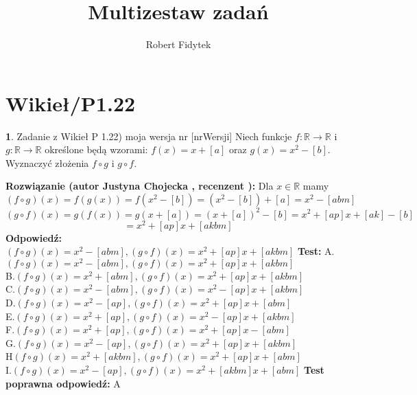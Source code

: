 \documentclass[12pt, a4paper]{article}
\title{Multizestaw zadań}
\author{Robert Fidytek}
\date{}
\theoremstyle{definition} %
\newtheorem{zad}{}
\newcommand{\kategoria}[1]{\section{#1}} %
\newcommand{\zadStart}[1]{\begin{zad}#1\newline} %
\newcommand{\zadStop}{\end{zad}}   %
\newcommand{\rozwStart}[2]{\noindent \textbf{Rozwiązanie (autor #1 , recenzent #2): }\newline} %
\newcommand{\rozwStop}{\newline}                                            %
\newcommand{\odpStart}{\noindent \textbf{Odpowiedź:}\newline}    %
\newcommand{\odpStop}{\newline}                                             %
\newcommand{\testStart}{\noindent \textbf{Test:}\newline} %
\newcommand{\testStop}{\newline} %
\newcommand{\kluczStart}{\noindent \textbf{Test poprawna odpowiedź:}\newline} %
\newcommand{\kluczStop}{\newline} %
\begin{document}
\maketitle


\kategoria{Wikieł/P1.22}
\zadStart{Zadanie z Wikieł P 1.22) moja wersja nr [nrWersji]}
Niech funkcje $f:\mathbb{R}\rightarrow\mathbb{R}$ i $g:\mathbb{R}\rightarrow\mathbb{R}$ określone będą wzorami: $f(x)=x+[a]$ oraz $g(x)=x^{2}-[b]$. Wyznaczyć złożenia $f\circ g$ i $g\circ f$.
\zadStop
\rozwStart{Justyna Chojecka}{}
Dla $x\in \mathbb{R}$ mamy
$$(f\circ g)(x)=f(g(x))=f(x^{2}-[b])=(x^{2}-[b])+[a]=x^2-[abm]$$
$$(g\circ f)(x)=g(f(x))=g(x+[a])=(x+[a])^{2}-[b]=x^{2}+[ap]x+[ak]-[b]$$$$=x^{2}+[ap]x+[akbm]$$
\rozwStop
\odpStart
$(f\circ g)(x)=x^2-[abm], (g\circ f)(x)=x^{2}+[ap]x+[akbm]$
\odpStop
\testStart
A.$(f\circ g)(x)=x^2-[abm], (g\circ f)(x)=x^{2}+[ap]x+[akbm]$\\
B.$(f\circ g)(x)=x^2+[abm], (g\circ f)(x)=x^{2}+[ap]x+[akbm]$\\
C.$(f\circ g)(x)=x^2-[abm], (g\circ f)(x)=x^{2}-[ap]x+[akbm]$\\
D.$(f\circ g)(x)=x^2-[ap], (g\circ f)(x)=x^{2}+[ap]x+[abm]$\\
E.$(f\circ g)(x)=x^2+[ap], (g\circ f)(x)=x^{2}-[ap]x+[akbm]$\\
F.$(f\circ g)(x)=x^2+[ap], (g\circ f)(x)=x^{2}+[ap]x-[abm]$\\
G.$(f\circ g)(x)=x^2-[ap], (g\circ f)(x)=x^{2}+[ap]x+[akbm]$\\
H$(f\circ g)(x)=x^2+[akbm], (g\circ f)(x)=x^{2}+[ap]x+[abm]$\\
I.$(f\circ g)(x)=x^2-[ap], (g\circ f)(x)=x^{2}+[akbm]x+[abm]$
\testStop
\kluczStart
A
\kluczStop
\end{document}
